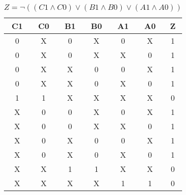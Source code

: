 
\begin{center}
    \begin{table}[h] \caption{\(Z = \lnot ((C1 \land C0) \lor (B1 \land B0) \lor (A1 \land A0)) \)}
        \begin{center}
            \begin{tabular}{|c|c|c|c|c|c||c|} \hline
            C1 & C0 & B1 & B0 & A1 & A0 & Z \\ \hline\hline
            0  & X  & 0  & X  & 0  & X  & 1 \\ \hline
            0  & X  & 0  & X  & X  & 0  & 1 \\ \hline
            0  & X  & X  & 0  & 0  & X  & 1 \\ \hline
            0  & X  & X  & 0  & X  & 0  & 1 \\ \hline
            1  & 1  & X  & X  & X  & X  & 0 \\ \hline
            X  & 0  & 0  & X  & 0  & X  & 1 \\ \hline
            X  & 0  & 0  & X  & X  & 0  & 1 \\ \hline
            X  & 0  & X  & 0  & 0  & X  & 1 \\ \hline
            X  & 0  & X  & 0  & X  & 0  & 1 \\ \hline
            X  & X  & 1  & 1  & X  & X  & 0 \\ \hline
            X  & X  & X  & X  & 1  & 1  & 0 \\ \hline
            \end{tabular}
        \end{center}
    \end{table}
\end{center}
